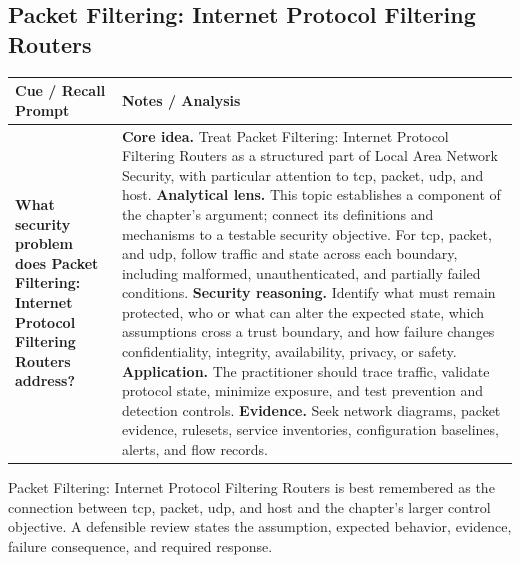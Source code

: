 \documentclass[11pt]{article}
\newcommand{\CornellHeader}{%
\rowcolor{Navy}\color{white}\bfseries Cue / Recall Prompt & \color{white}\bfseries Notes / Analysis\\\hline}
\newcommand{\CornellRow}[2]{%
\cellcolor{CueGray}\RaggedRight\textbf{#1} & \RaggedRight #2\\\hline}
\begin{document}
\subsection*{Packet Filtering: Internet Protocol Filtering Routers}
\begin{longtable}{>{\RaggedRight\arraybackslash}p{}|>{\RaggedRight\arraybackslash}p{}}
\CornellHeader
\CornellRow{What security problem does Packet Filtering: Internet Protocol Filtering Routers address?}{\textbf{Core idea.} Treat Packet Filtering: Internet Protocol Filtering Routers as a structured part of Local Area Network Security, with particular attention to tcp, packet, udp, and host. \textbf{Analytical lens.} This topic establishes a component of the chapter's argument; connect its definitions and mechanisms to a testable security objective. For tcp, packet, and udp, follow traffic and state across each boundary, including malformed, unauthenticated, and partially failed conditions. \textbf{Security reasoning.} Identify what must remain protected, who or what can alter the expected state, which assumptions cross a trust boundary, and how failure changes confidentiality, integrity, availability, privacy, or safety. \textbf{Application.} The practitioner should trace traffic, validate protocol state, minimize exposure, and test prevention and detection controls. \textbf{Evidence.} Seek network diagrams, packet evidence, rulesets, service inventories, configuration baselines, alerts, and flow records.}
\end{longtable}
\begin{topicsummary}
Packet Filtering: Internet Protocol Filtering Routers is best remembered as the connection between tcp, packet, udp, and host and the chapter's larger control objective. A defensible review states the assumption, expected behavior, evidence, failure consequence, and required response.
\end{topicsummary}
\end{document}
